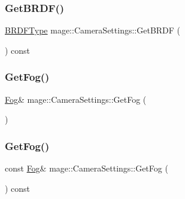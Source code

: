 \hypertarget{classmage_1_1_camera_settings_a31504f7e9b23404ee1b200561b8dd789}{}\label{classmage_1_1_camera_settings_a31504f7e9b23404ee1b200561b8dd789} 
\subsubsection{\texorpdfstring{Get\+B\+R\+D\+F()}{GetBRDF()}}
{\footnotesize\ttfamily \hyperlink{namespacemage_ae7a7a03a7b34d7e2689689bb8295cd38}{B\+R\+D\+F\+Type} mage\+::\+Camera\+Settings\+::\+Get\+B\+R\+DF (\begin{DoxyParamCaption}{ }\end{DoxyParamCaption}) const\hspace{0.3cm}{\ttfamily [noexcept]}}

\hypertarget{classmage_1_1_camera_settings_ae1ba03a765f304703502bcd7de15d436}{}\label{classmage_1_1_camera_settings_ae1ba03a765f304703502bcd7de15d436} 
\subsubsection{\texorpdfstring{Get\+Fog()}{GetFog()}\hspace{0.1cm}{\footnotesize\ttfamily [1/2]}}
{\footnotesize\ttfamily \hyperlink{classmage_1_1_fog}{Fog}\& mage\+::\+Camera\+Settings\+::\+Get\+Fog (\begin{DoxyParamCaption}{ }\end{DoxyParamCaption})\hspace{0.3cm}{\ttfamily [noexcept]}}

\hypertarget{classmage_1_1_camera_settings_a84098b0518f7eada941944b8155372a8}{}\label{classmage_1_1_camera_settings_a84098b0518f7eada941944b8155372a8} 
\subsubsection{\texorpdfstring{Get\+Fog()}{GetFog()}\hspace{0.1cm}{\footnotesize\ttfamily [2/2]}}
{\footnotesize\ttfamily const \hyperlink{classmage_1_1_fog}{Fog}\& mage\+::\+Camera\+Settings\+::\+Get\+Fog (\begin{DoxyParamCaption}{ }\end{DoxyParamCaption}) const\hspace{0.3cm}{\ttfamily [noexcept]}}

